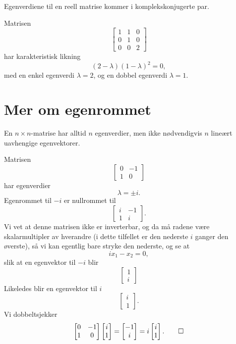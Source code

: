 \begin{thm}
Egenverdiene til en reell matrise kommer i komplekskonjugerte par.
\end{thm}


\begin{ex}
Matrisen
\[
\begin{bmatrix}
1 & 1 & 0\\  0 &1 & 0 \\ 0 & 0 & 2
\end{bmatrix}
\]
har karakteristisk likning
\[
(2-\lambda)(1-\lambda)^2=0,
\]
med en enkel egenverdi $\lambda=2$, og en dobbel egenverdi $\lambda=1$. 
\end{ex}


\section*{Mer om egenrommet}
En $n \times n$-matrise har alltid $n$ egenverdier, 
men ikke nødvendigvis $n$ lineært uavhengige egenvektorer.

\begin{ex}
Matrisen
\[
\begin{bmatrix}
0 & -1 \\ 1 &0
\end{bmatrix}
\]
har egenverdier
\[
\lambda=\pm i.
\] 
Egenrommet til $-i$ er nullrommet til 
\[
\begin{bmatrix}
i & -1 \\ 1 &i
\end{bmatrix}.
\]
Vi vet at denne matrisen ikke er inverterbar,
og da må radene være skalarmultipler av hverandre (i dette tilfellet er den nederste $i$ ganger den øverste), 
så vi kan egentlig bare stryke den nederste, og se at
\[
ix_1-x_2=0,
\]
slik at en egenvektor til $-i$ blir
\[
\begin{bmatrix}
1  \\ i
\end{bmatrix}
\]
Likeledes blir en egenvektor til $i$ 
\[
\begin{bmatrix}
i  \\ 1
\end{bmatrix}.
\]
Vi dobbeltsjekker
\[
\begin{bmatrix}
0 & -1 \\ 1 &0
\end{bmatrix}
\begin{bmatrix}
i  \\ 1
\end{bmatrix}
=
\begin{bmatrix}
-1  \\ i
\end{bmatrix}
=
i
\begin{bmatrix}
i  \\ 1
\end{bmatrix}.\qedhere
\]
\end{ex}

